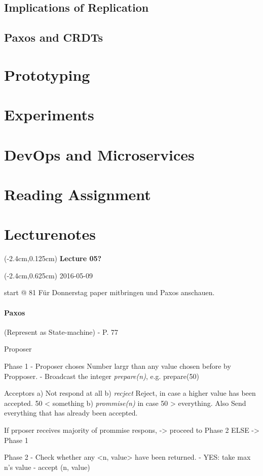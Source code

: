 \documentclass[a4paper,12pt]{article}%
\newcommand{\lecture}[2]{\color{black} 
	
	\begin{textblock*}{3cm}(-2.4cm,0.125cm)
		{\bf Lecture {#1}}
	\end{textblock*}
	
	\begin{textblock*}{3cm}(-2.4cm,0.625cm)
		#2
	\end{textblock*}
}
\begin{document}
\newpage
\subsection{Implications of Replication}

\newpage
\subsection{Paxos and CRDTs}


\section{Prototyping}
\section{Experiments}
\section{DevOps and Microservices}
\section{Reading Assignment}


\newpage
\section{Lecturenotes}
\lecture{05?}{2016-05-09} start @ 81
Für Donnerstag paper mitbringen und Paxos anschauen.

\paragraph{Paxos} (Represent as State-machine) - P. 77


Proposer


Phase 1
- Proposer choses Number largr than any value chosen before by Propposer. 
- Broadcast the integer {\it prepare(n)}, e.g. prepare(50)

Acceptors
a) Not respond at all
b) {\it recject} Reject, in case a higher value has been accepted. 50 < something
b) {\it prommise(n)} in case 50 > everything. Also Send everything that has already been accepted.

If prposer receives majority of prommise respons, -> proceed to Phase 2 ELSE -> Phase 1

Phase 2
- Check whether any <n, value> have been returned. 
- YES: take max n's value
- accept (n, value)
\end{document}
